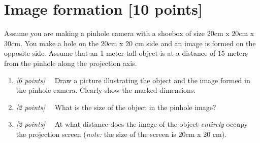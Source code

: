 \documentclass[10pt,letterpaper]{article}
\newcommand{\cmd}[1] {{\color{blue}\texttt{#1}}}
\newcommand{\points}[1]{{\color{mygreen}\emph{[#1]\ \ }}}
\begin{document}
%
%

\newpage
\section{Image formation [10 points]}
Assume you are making a pinhole camera with a shoebox of size 20cm x 20cm x 30cm. You make a hole on the 20cm x 20 cm side and an image is formed on the opposite side. Assume that an 1 meter tall object is at a distance of 15 meters from the pinhole along the projection axis. 
\begin{enumerate}
\item \points{6 points} Draw a picture illustrating the object and the image formed in the pinhole camera. Clearly show the marked dimensions.
\vspace{3in}
\item \points{2 points} What is the size of the object in the pinhole image?
\vspace{1in}
\item \points{2 points} At what distance does the image of the object \emph{entirely} occupy the projection screen (\emph{note:} the size of the screen is 20cm x 20 cm).
\vspace{1in}
\end{enumerate}
\end{document}
